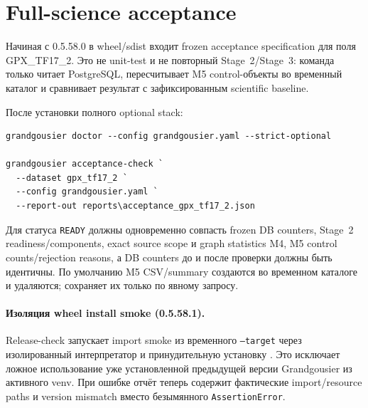 \section{Full-science acceptance}

Начиная с 0.5.58.0 в wheel/sdist входит frozen acceptance specification для поля GPX\_TF17\_2. Это не unit-test и не повторный Stage~2/Stage~3: команда только читает PostgreSQL, пересчитывает M5 control-объекты во временный каталог и сравнивает результат с зафиксированным scientific baseline.

После установки полного optional stack:

\begin{lstlisting}
grandgousier doctor --config grandgousier.yaml --strict-optional

grandgousier acceptance-check `
  --dataset gpx_tf17_2 `
  --config grandgousier.yaml `
  --report-out reports\acceptance_gpx_tf17_2.json
\end{lstlisting}

Для статуса \texttt{READY} должны одновременно совпасть frozen DB counters, Stage~2 readiness/components, exact source scope и graph statistics M4, M5 control counts/rejection reasons, а DB counters до и после проверки должны быть идентичны. По умолчанию M5 CSV/summary создаются во временном каталоге и удаляются;  сохраняет их только по явному запросу.

\paragraph{Изоляция wheel install smoke (0.5.58.1).}
Release-check запускает import smoke из временного \texttt{--target} через изолированный интерпретатор  и принудительную установку . Это исключает ложное использование уже установленной предыдущей версии Grandgousier из активного venv. При ошибке отчёт теперь содержит фактические import/resource paths и version mismatch вместо безымянного \texttt{AssertionError}.
